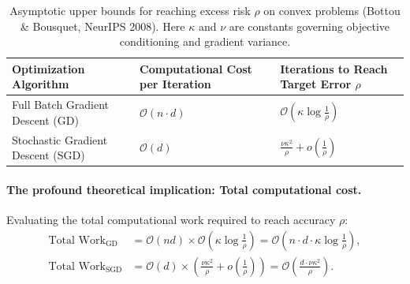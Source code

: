 \begin{table}[htbp]
\centering
\caption{Asymptotic upper bounds for reaching excess risk $\rho$ on convex problems (Bottou \& Bousquet, NeurIPS 2008). Here $\kappa$ and $\nu$ are constants governing objective conditioning and gradient variance.}
\label{tab:bottou_bousquet_bounds}
\begin{tabularx}{0.92\textwidth}{lXX}
\toprule
\textbf{Optimization Algorithm} & \textbf{Computational Cost per Iteration} & \textbf{Iterations to Reach Target Error $\rho$} \\
\midrule
Full Batch Gradient Descent (GD) & $\mathcal{O}(n \cdot d)$ & $\mathcal{O}\left(\kappa \log \frac{1}{\rho}\right)$ \\
\addlinespace
Stochastic Gradient Descent (SGD) & $\mathcal{O}(d)$ & $\frac{\nu \kappa^2}{\rho} + o\left(\frac{1}{\rho}\right)$ \\
\bottomrule
\end{tabularx}
\end{table}

\paragraph{The profound theoretical implication: Total computational cost.}
Evaluating the total computational work required to reach accuracy $\rho$:
\begin{align}
\text{Total Work}_{\text{GD}} &= \mathcal{O}(nd) \times \mathcal{O}\left(\kappa \log \frac{1}{\rho}\right) = \mathcal{O}\left( n \cdot d \cdot \kappa \log \frac{1}{\rho} \right), \label{eq:total_work_gd} \\
\text{Total Work}_{\text{SGD}} &= \mathcal{O}(d) \times \left( \frac{\nu \kappa^2}{\rho} + o\left(\frac{1}{\rho}\right) \right) = \mathcal{O}\left( \frac{d \cdot \nu \kappa^2}{\rho} \right). \label{eq:total_work_sgd}
\end{align}


